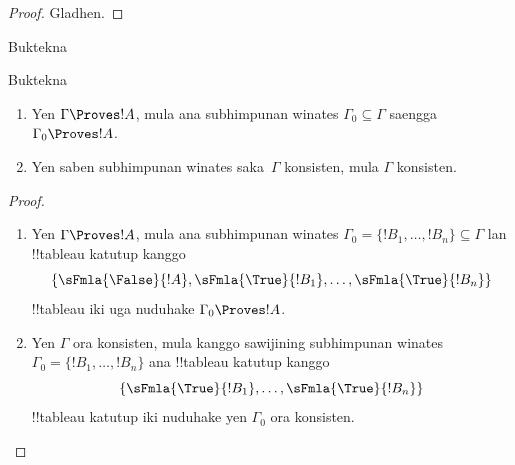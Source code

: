 \documentclass[../../../include/open-logic-section]{subfiles}
\begin{document}
\begin{proof}
Gladhen.
\end{proof}

\begin{prob}
Buktekna 
\end{prob}
\tagendprob

\begin{prob}
Buktekna 
\end{prob}
\tagendprob

\begin{prop}[Kekompakan]
  \begin{enumerate}
  \item Yen $\Gamma \Proves !A$, mula ana subhimpunan winates
    $\Gamma_0 \subseteq \Gamma$ saengga $\Gamma_0 \Proves !A$.
  \item Yen saben subhimpunan winates saka~$\Gamma$ konsisten,
    mula $\Gamma$ konsisten.
  \end{enumerate}
\end{prop}

\begin{proof}
  \begin{enumerate}
    \item Yen $\Gamma \Proves !A$, mula ana subhimpunan winates
      $\Gamma_0 = \{!B_1, \dots, !B_n\} \subseteq \Gamma$ lan !!{tableau} katutup
      kanggo
      \[
      \{\sFmla{\False}{!A}, \sFmla{\True}{!B_1}, \dots, \sFmla{\True}{!B_n}\}
      \]
      !!{tableau} iki uga nuduhake $\Gamma_0 \Proves !A$.
    \item Yen $\Gamma$ ora konsisten, mula kanggo sawijining
      subhimpunan winates $\Gamma_0 = \{!B_1, \dots, !B_n\}$ ana
      !!{tableau} katutup kanggo
      \[
      \{\sFmla{\True}{!B_1}, \dots, \sFmla{\True}{!B_n}\}
      \]
      !!{tableau} katutup iki nuduhake yen $\Gamma_0$ ora konsisten.
  \end{enumerate}
\end{proof}
\end{document}
